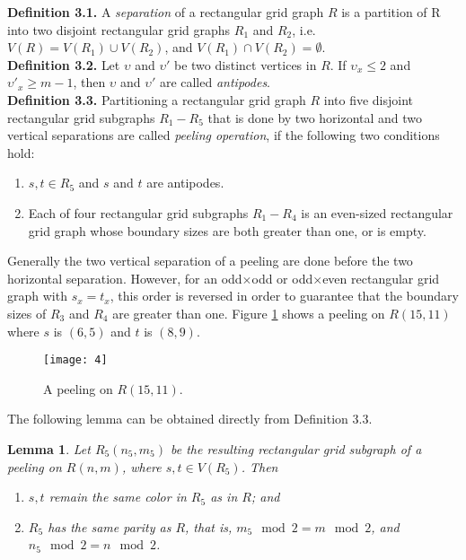 \documentclass[preprint,12pt]{elsarticle}
\newtheorem{lem}{Lemma}[section]
\begin{document}
\noindent\textbf{Definition 3.1.} \cite{FAA:ALAFFLPIRGG} A
\textit{separation} of a rectangular grid graph $R$ is a partition
of R into two disjoint rectangular grid graphs $R_1$ and $R_2$, i.e.
$V(R)=V(R_{1})\cup V(R_{2})$, and $V(R_{1})\cap
V(R_{2})=\emptyset$.\\

\noindent\textbf{Definition 3.2.} \cite{IPS:HPIGG} Let $\upsilon$
and $\upsilon'$ be two distinct vertices in $R$. If
$\upsilon_{x}\leq2$ and $\upsilon'_{x}\geq m-1$, then $\upsilon$ and
$\upsilon'$ are called \textit{antipodes}.
\\

\noindent\textbf{Definition 3.3.} \cite{CST:AFAFCHPIM} Partitioning
a rectangular grid graph $R$ into five disjoint rectangular grid
subgraphs $R_{1}-R_{5}$ that is done by two horizontal and two
vertical separations are called \textit{peeling operation}, if the following two conditions hold:
\begin{enumerate}
\item $s,t\in R_{5}$ and $s$ and $t$ are antipodes.
\item  Each of four rectangular grid subgraphs $R_{1}-R_{4}$ is an
even-sized rectangular grid graph whose boundary sizes are both
greater than one, or is empty.
\end{enumerate}
Generally the two vertical separation of a peeling are done before
the two horizontal separation. However, for an odd$\times$odd or
odd$\times$even rectangular grid graph with $s_{x}=t_{x}$, this
order is reversed in order to guarantee that the boundary sizes of
$R_3$ and $R_4$ are greater than one. Figure
\ref{a} shows a peeling on $R(15,11)$ where $s$ is $(6, 5)$ and $t$ is $(8, 9)$.\\
\begin{figure}[htb]
  \centering
  \texttt{[image: 4]}
  \caption[]{\small A peeling on $R(15,11)$.}
  \label{a}
\end{figure}
The following lemma can be obtained directly from Definition 3.3.
\begin{lem} \label{Lemma:5} \cite{CST:AFAFCHPIM}
Let $R_{5}(n_{5},m_{5})$ be the resulting rectangular grid subgraph
of a peeling on $R(n,m)$, where $s,t \in V(R_{5})$. Then
\begin{enumerate}
\item $s,t$ remain the same color in $R_{5}$ as in $R$; and
\item $R_{5}$ has the same parity as $R$, that is, $m_{5}
\mod 2 = m \mod 2$, and $n_{5} \mod 2 = n \mod 2$.
\end{enumerate}
\end{lem}
\end{document}
